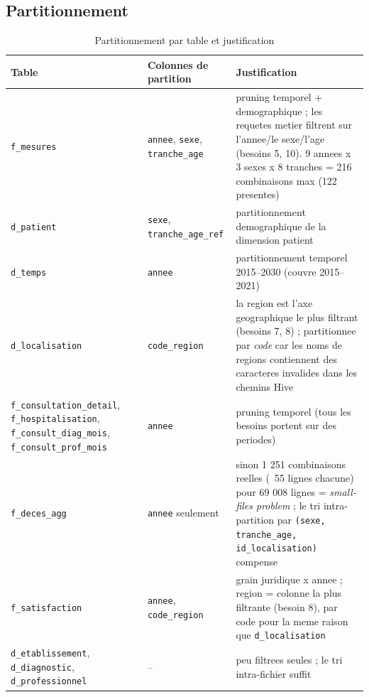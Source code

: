 \documentclass[11pt,a4paper]{article}
\begin{document}
\subsection{Partitionnement}
\begin{table}[H]\centering\small
\caption{Partitionnement par table et justification}
\begin{tabular}{p{4.2cm}p{3.6cm}p{7.4cm}}
\toprule
\textbf{Table} & \textbf{Colonnes de partition} & \textbf{Justification} \\
\midrule
\texttt{f\_mesures} & \texttt{annee}, \texttt{sexe}, \texttt{tranche\_age} & pruning temporel + demographique ; les requetes metier filtrent sur l'annee/le sexe/l'age (besoins 5, 10). 9 annees x 3 sexes x 8 tranches = 216 combinaisons max (122 presentes) \\
\texttt{d\_patient} & \texttt{sexe}, \texttt{tranche\_age\_ref} & partitionnement demographique de la dimension patient \\
\texttt{d\_temps} & \texttt{annee} & partitionnement temporel 2015--2030 (couvre 2015--2021) \\
\texttt{d\_localisation} & \texttt{code\_region} & la region est l'axe geographique le plus filtrant (besoins 7, 8) ; partitionnee par \emph{code} car les noms de regions contiennent des caracteres invalides dans les chemins Hive \\
\texttt{f\_consultation\_detail}, \texttt{f\_hospitalisation}, \texttt{f\_consult\_diag\_mois}, \texttt{f\_consult\_prof\_mois} & \texttt{annee} & pruning temporel (tous les besoins portent sur des periodes) \\
\texttt{f\_deces\_agg} & \texttt{annee} seulement & sinon 1 251 combinaisons reelles (~55 lignes chacune) pour 69 008 lignes = \emph{small-files problem} ; le tri intra-partition par \texttt{(sexe, tranche\_age, id\_localisation)} compense \\
\texttt{f\_satisfaction} & \texttt{annee}, \texttt{code\_region} & grain juridique x annee ; region = colonne la plus filtrante (besoin 8), par code pour la meme raison que \texttt{d\_localisation} \\
\texttt{d\_etablissement}, \texttt{d\_diagnostic}, \texttt{d\_professionnel} & -- & peu filtrees seules ; le tri intra-fichier suffit \\
\bottomrule
\end{tabular}
\end{table}
\end{document}
